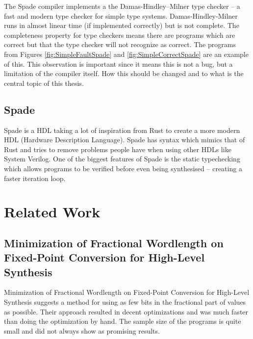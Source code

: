 The Spade compiler implements a the Damas-Hindley–Milner type checker -- a fast and modern type checker for simple type systems. Damas-Hindley-Milner runs in almost linear time (if implemented correctly) but is not complete. The completeness property for type checkers means there are programs which are correct but that the type checker will not recognize as correct. The programs from Figures \ref{fig:SimpleFaultSpade} and \ref{fig:SimpleCorrectSpade} are an example of this. This observation is important since it means this is not a bug, but a limitation of the compiler itself. How this should be changed and to what is the central topic of this thesis.

\section{Spade}
Spade is a HDL taking a lot of inspiration from Rust to create a more modern HDL (Hardware Description Language). Spade has syntax which mimics that of Rust and tries to remove problems people have when using other HDLs like System Verilog. One of the biggest features of Spade is the static typechecking which allows programs to be verified before even being synthesised -- creating a faster iteration loop.
\cite{src:spadeSomething} \cite{src:spadeAnHDL}





\chapter{Related Work}

\section{Minimization of Fractional Wordlength on Fixed-Point Conversion for High-Level Synthesis}
Minimization of Fractional Wordlength on Fixed-Point Conversion for High-Level Synthesis suggests a method for using as few bits in the fractional part of values as possible. Their approach resulted in decent optimizations and was much faster than doing the optimization by hand. The sample size of the programs is quite small and did not always show as promising results.

